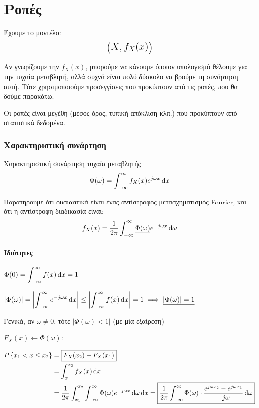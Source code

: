\documentclass[11pt,a4paper,notitlepage,fleqn,draft]{article}
\begin{document}
\section{Ροπές}
Έχουμε το μοντέλο:
\[
\left(\mathlarger{\mathlarger{X,f_X(x)}}\right)
\]

Αν γνωρίζουμε την \( f_X(x) \), μπορούμε να κάνουμε όποιον
υπολογισμό θέλουμε για την τυχαία μεταβλητή, αλλά συχνά είναι
πολύ δύσκολο να βρούμε τη συνάρτηση αυτή. Τότε χρησιμοποιούμε
προσεγγίσεις που προκύπτουν από τις ροπές, που θα δούμε παρακάτω.

Οι ροπές είναι μεγέθη (μέσος όρος, τυπική απόκλιση κλπ.) που
προκύπτουν από στατιστικά δεδομένα.

\subsubsection{Χαρακτηριστική συνάρτηση}
\begin{defn}{Χαρακτηριστική συνάρτηση τυχαία μεταβλητής}{}
	\[
	\Phi(\omega ) = \int_{-\infty}^{\infty} f_X(x) e^{j\omega x}
	\mathop{}\!\mathrm{d} x
	\]
\end{defn}
Παρατηρούμε ότι ουσιαστικά είναι ένας αντίστροφος μετασχηματισμός
Fourier, και ότι η αντίστροφη διαδικασία είναι:
\[
f_X(x) = \frac{1}{2\pi} \int_{-\infty}^{\infty}
\underline{\Phi(\omega )} e^{-j\omega x}\mathop{}\!\mathrm{d} \omega 
\]

\paragraph{Ιδιότητες}
\begin{enumpar}
	\item \( \displaystyle \Phi(0)
	= \int_{-\infty}^{\infty} f(x)\mathop{}\!\mathrm{d} x = 1 \)
	\item \( \displaystyle \left| \Phi(\omega ) \right| = \left|
	\int_{-\infty}^{\infty} e^{-j\omega x}\mathop{}\!\mathrm{d} x
	\right| 
	\leq \left|\int_{-\infty}^{\infty} f(x)\mathop{}\!\mathrm{d} x\right| = 1
	\implies \underline{\left|\Phi(\omega )\right|=1}
	\)
	
	Γενικά, αν \( \omega \neq 0 \), τότε \( \left|
	\Phi(\omega ) < 1
	\right| \) (με μία εξαίρεση)
	\item \( F_X(x) \leftarrow \Phi(\omega ) \):
	
	\begin{align*}
		P\left\lbrace x_1 < x \leq x_2 \right\rbrace
		&= \boxed{F_X(x_2) - F_X(x_1)}
		\\ &= \int_{x_1}^{x_2} f_X(x)\mathop{}\!\mathrm{d} x
		\\ &= \frac{1}{2\pi} \int_{x_1}^{x_2}
		\int_{-\infty}^{\infty} \Phi(\omega )e^{-j\omega x}
		\mathop{}\!\mathrm{d} \omega \mathop{}\!\mathrm{d} x = \boxed{
			\frac{1}{2\pi} \int_{-\infty}^{\infty}
			\Phi(\omega) \cdot
			\frac{e^{j\omega x_2}-e^{j\omega x_1}}{-j\omega }
			\mathop{}\!\mathrm{d} \omega 
			}
	\end{align*}
\end{enumpar}
\end{document}
